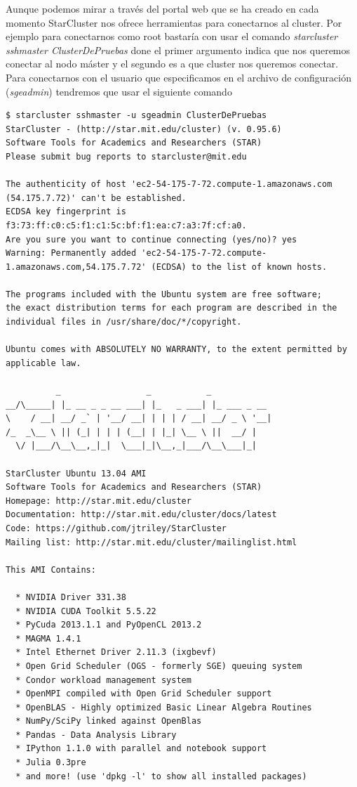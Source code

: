 \documentclass{article}
\begin{document}
	Aunque podemos mirar a través del portal web que se ha creado en cada momento StarCluster nos ofrece herramientas para conectarnos al cluster. Por ejemplo para conectarnos como root bastaría con usar el comando \emph{starcluster sshmaster ClusterDePruebas} done el primer argumento indica que nos queremos conectar al nodo máster y el segundo es a que cluster nos queremos conectar. Para conectarnos con el usuario que especificamos en el archivo de configuración (\emph{sgeadmin}) tendremos que usar el siguiente comando
\begin{lstlisting}[style=miniBash]
$ starcluster sshmaster -u sgeadmin ClusterDePruebas
StarCluster - (http://star.mit.edu/cluster) (v. 0.95.6)
Software Tools for Academics and Researchers (STAR)
Please submit bug reports to starcluster@mit.edu

The authenticity of host 'ec2-54-175-7-72.compute-1.amazonaws.com (54.175.7.72)' can't be established.
ECDSA key fingerprint is f3:73:ff:c0:c5:f1:c1:5c:bf:f1:ea:c7:a3:7f:cf:a0.
Are you sure you want to continue connecting (yes/no)? yes
Warning: Permanently added 'ec2-54-175-7-72.compute-1.amazonaws.com,54.175.7.72' (ECDSA) to the list of known hosts.

The programs included with the Ubuntu system are free software;
the exact distribution terms for each program are described in the
individual files in /usr/share/doc/*/copyright.

Ubuntu comes with ABSOLUTELY NO WARRANTY, to the extent permitted by
applicable law.

          _                 _           _
__/\_____| |_ __ _ _ __ ___| |_   _ ___| |_ ___ _ __
\    / __| __/ _` | '__/ __| | | | / __| __/ _ \ '__|
/_  _\__ \ || (_| | | | (__| | |_| \__ \ ||  __/ |
  \/ |___/\__\__,_|_|  \___|_|\__,_|___/\__\___|_|

StarCluster Ubuntu 13.04 AMI
Software Tools for Academics and Researchers (STAR)
Homepage: http://star.mit.edu/cluster
Documentation: http://star.mit.edu/cluster/docs/latest
Code: https://github.com/jtriley/StarCluster
Mailing list: http://star.mit.edu/cluster/mailinglist.html

This AMI Contains:

  * NVIDIA Driver 331.38
  * NVIDIA CUDA Toolkit 5.5.22
  * PyCuda 2013.1.1 and PyOpenCL 2013.2
  * MAGMA 1.4.1
  * Intel Ethernet Driver 2.11.3 (ixgbevf)
  * Open Grid Scheduler (OGS - formerly SGE) queuing system
  * Condor workload management system
  * OpenMPI compiled with Open Grid Scheduler support
  * OpenBLAS - Highly optimized Basic Linear Algebra Routines
  * NumPy/SciPy linked against OpenBlas
  * Pandas - Data Analysis Library
  * IPython 1.1.0 with parallel and notebook support
  * Julia 0.3pre
  * and more! (use 'dpkg -l' to show all installed packages)


\end{lstlisting}
\end{document}
